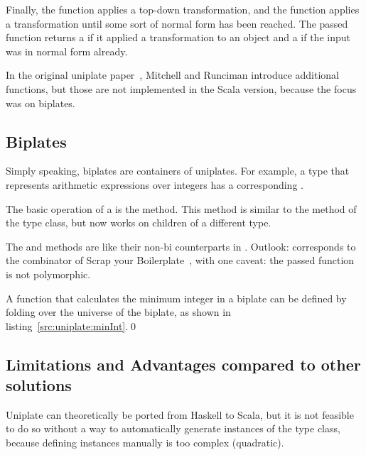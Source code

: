 Finally, the  function applies a top-down transformation, and the  function applies a transformation until some sort of
normal form has been reached. The passed function returns a  if
it applied a transformation to an object and a  if the input was
in normal form already.




In the original uniplate paper~\cite{DBLP:conf/haskell/MitchellR07}, Mitchell
and Runciman introduce additional functions, but those are not implemented
in the Scala version, because the focus was on biplates.

\subsection{Biplates}
Simply speaking, biplates are containers of uniplates. For example, a type
 that represents arithmetic expressions over integers has a corresponding
.



The basic operation of a  is the  method. This method
is similar to the  method of the  type class, but now
works on children of a different type.

The  and  methods are like their non-bi counterparts
in . Outlook:  corresponds to the
 combinator of Scrap your Boilerplate~\cite{DBLP:conf/tldi/LammelJ03},
with one caveat: the passed function is not polymorphic.

\begin{example}
A function that calculates the minimum integer in a biplate can be defined
by folding  over the universe of the biplate, as shown
in listing~\ref{src:uniplate:minInt}.\qed



\end{example}

\subsection{Limitations and Advantages compared to other solutions}
Uniplate can theoretically be ported from Haskell to Scala, but it is not
feasible to do so without a way to automatically generate instances of the
 type class, because defining instances manually is too complex
(quadratic).


